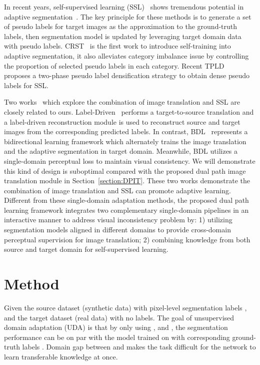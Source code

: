 \documentclass[10pt,twocolumn,letterpaper]{article}
\begin{document}
In recent years, self-supervised learning (SSL)~\cite{grandvalet2005semi,zhu2007semi} shows tremendous potential in adaptive segmentation~\cite{zou2018unsupervised,zou2019confidence,subhani2020learning,Two-phase}. The key principle for these methods is to generate a set of pseudo labels for target images as the approximation to the ground-truth labels, then segmentation model is updated by leveraging target domain data with pseudo labels. CRST~\cite{zou2018unsupervised} is the first work to introduce self-training into adaptive segmentation, it also alleviates category imbalance issue by controlling the proportion of selected pseudo labels in each category. Recent TPLD~\cite{Two-phase} proposes a two-phase pseudo label densification strategy to obtain dense pseudo labels for SSL. 

Two works~\cite{li2019bidirectional, yang2020label} which explore the combination of image translation and SSL are closely related to ours. Label-Driven~\cite{yang2020label} performs a target-to-source translation and a label-driven reconstruction module is used to reconstruct source and target images from the corresponding predicted labels. In contrast, BDL~\cite{li2019bidirectional} represents a bidirectional learning framework which alternately trains the image translation and the adaptive segmentation in target domain. Meanwhile, BDL utilizes a single-domain perceptual loss to maintain visual consistency. We will demonstrate this kind of design is suboptimal compared with the proposed dual path image translation module in Section~\ref{section:DPIT}. These two works demonstrate the combination of image translation and SSL can promote adaptive learning. Different from these single-domain adaptation methods, the proposed dual path learning framework integrates two complementary single-domain pipelines in an interactive manner to address visual inconsistency problem by: 1) utilizing segmentation models aligned in different domains to provide cross-domain perceptual supervision for image translation; 2) combining knowledge from both source and target domain for self-supervised learning.

\section{Method}
Given the source dataset  (synthetic data) with pixel-level segmentation labels , and the target dataset  (real data) with no labels. The goal of unsupervised domain adaptation (UDA) is that by only using ,  and , the segmentation performance can be on par with the model trained on  with corresponding ground-truth labels . Domain gap between  and  makes the task difficult for the network to learn transferable knowledge at once.
\end{document}
